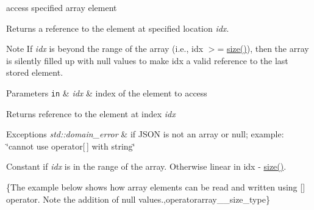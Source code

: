 access specified array element 

Returns a reference to the element at specified location {\itshape idx}.

\begin{DoxyNote}{Note}
If {\itshape idx} is beyond the range of the array (i.\-e., {\ttfamily idx $>$= \hyperlink{classnlohmann_1_1basic__json_a0ea8a1ecca4b3cb0ba09ad7552c364b6}{size()}}), then the array is silently filled up with {\ttfamily null} values to make {\ttfamily idx} a valid reference to the last stored element.
\end{DoxyNote}

\begin{DoxyParams}[1]{Parameters}
\mbox{\tt in}  & {\em idx} & index of the element to access\\
\hline
\end{DoxyParams}
\begin{DoxyReturn}{Returns}
reference to the element at index {\itshape idx} 
\end{DoxyReturn}

\begin{DoxyExceptions}{Exceptions}
{\em std\-::domain\-\_\-error} & if J\-S\-O\-N is not an array or null; example\-: {\ttfamily \char`\"{}cannot use operator\mbox{[}$\,$\mbox{]} with string\char`\"{}}\\
\hline
\end{DoxyExceptions}
Constant if {\itshape idx} is in the range of the array. Otherwise linear in {\ttfamily idx -\/ \hyperlink{classnlohmann_1_1basic__json_a0ea8a1ecca4b3cb0ba09ad7552c364b6}{size()}}.

\{The example below shows how array elements can be read and written using {\ttfamily \mbox{[}\mbox{]}} operator. Note the addition of {\ttfamily null} values.,operatorarray\-\_\-\-\_\-size\-\_\-type\}

